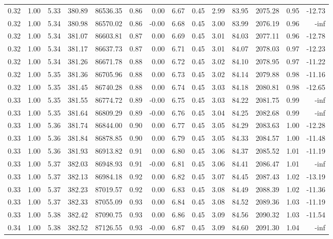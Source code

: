\begin{table}[!ht]
\begin{tabular}{rrrrrrrrrrrrrr}
0.32 & 1.00 & 5.33 & 380.89 & 86536.35 & 0.86 & 0.00 & 6.67 & 0.45 & 2.99 & 83.95 & 2075.28 & 0.95 & -12.73 \\
0.32 & 1.00 & 5.34 & 380.98 & 86570.02 & 0.86 & -0.00 & 6.68 & 0.45 & 3.00 & 83.99 & 2076.19 & 0.96 & -inf \\
0.32 & 1.00 & 5.34 & 381.07 & 86603.81 & 0.87 & 0.00 & 6.69 & 0.45 & 3.01 & 84.03 & 2077.11 & 0.96 & -12.78 \\
0.32 & 1.00 & 5.34 & 381.17 & 86637.73 & 0.87 & 0.00 & 6.71 & 0.45 & 3.01 & 84.07 & 2078.03 & 0.97 & -12.23 \\
0.32 & 1.00 & 5.34 & 381.26 & 86671.78 & 0.88 & 0.00 & 6.72 & 0.45 & 3.02 & 84.10 & 2078.95 & 0.97 & -11.22 \\
0.32 & 1.00 & 5.35 & 381.36 & 86705.96 & 0.88 & 0.00 & 6.73 & 0.45 & 3.02 & 84.14 & 2079.88 & 0.98 & -11.16 \\
0.32 & 1.00 & 5.35 & 381.45 & 86740.28 & 0.88 & 0.00 & 6.74 & 0.45 & 3.03 & 84.18 & 2080.81 & 0.98 & -12.65 \\
0.33 & 1.00 & 5.35 & 381.55 & 86774.72 & 0.89 & -0.00 & 6.75 & 0.45 & 3.03 & 84.22 & 2081.75 & 0.99 & -inf \\
0.33 & 1.00 & 5.35 & 381.64 & 86809.29 & 0.89 & -0.00 & 6.76 & 0.45 & 3.04 & 84.25 & 2082.68 & 0.99 & -inf \\
0.33 & 1.00 & 5.36 & 381.74 & 86844.00 & 0.90 & 0.00 & 6.77 & 0.45 & 3.05 & 84.29 & 2083.63 & 1.00 & -12.28 \\
0.33 & 1.00 & 5.36 & 381.84 & 86878.85 & 0.90 & 0.00 & 6.79 & 0.45 & 3.05 & 84.33 & 2084.57 & 1.00 & -11.48 \\
0.33 & 1.00 & 5.36 & 381.93 & 86913.82 & 0.91 & 0.00 & 6.80 & 0.45 & 3.06 & 84.37 & 2085.52 & 1.01 & -11.19 \\
0.33 & 1.00 & 5.37 & 382.03 & 86948.93 & 0.91 & -0.00 & 6.81 & 0.45 & 3.06 & 84.41 & 2086.47 & 1.01 & -inf \\
0.33 & 1.00 & 5.37 & 382.13 & 86984.18 & 0.92 & 0.00 & 6.82 & 0.45 & 3.07 & 84.45 & 2087.43 & 1.02 & -13.19 \\
0.33 & 1.00 & 5.37 & 382.23 & 87019.57 & 0.92 & 0.00 & 6.83 & 0.45 & 3.08 & 84.49 & 2088.39 & 1.02 & -11.36 \\
0.33 & 1.00 & 5.37 & 382.33 & 87055.09 & 0.93 & 0.00 & 6.84 & 0.45 & 3.08 & 84.52 & 2089.36 & 1.03 & -11.19 \\
0.33 & 1.00 & 5.38 & 382.42 & 87090.75 & 0.93 & 0.00 & 6.86 & 0.45 & 3.09 & 84.56 & 2090.32 & 1.03 & -11.54 \\
0.34 & 1.00 & 5.38 & 382.52 & 87126.55 & 0.93 & -0.00 & 6.87 & 0.45 & 3.09 & 84.60 & 2091.30 & 1.04 & -inf \\

\end{tabular}
\end{table}
